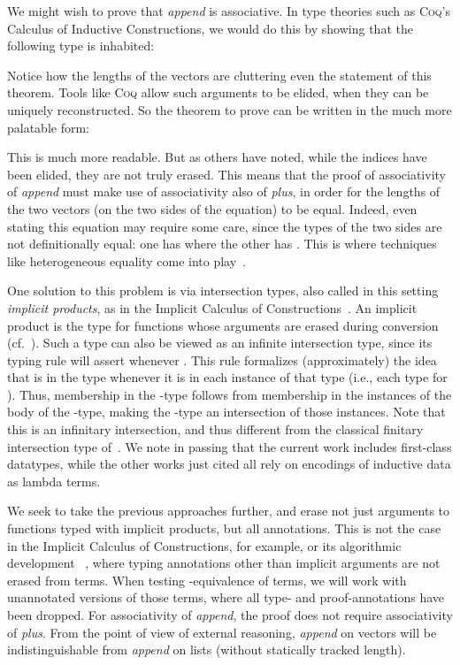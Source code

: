 \documentclass[copyright]{eptcs}
\begin{document}
\noindent We might wish to prove that \textit{append} is associative.
In type theories such as \textsc{Coq}'s Calculus of Inductive
Constructions, we would do this by showing that the following type is
inhabited:

\noindent Notice how the lengths of the vectors are cluttering even
the statement of this theorem.  Tools like \textsc{Coq} allow such
arguments to be elided, when they can be uniquely reconstructed.  So
the theorem to prove can be written in the much more palatable form:

\noindent This is much more readable.  But as others have noted, while
the indices have been elided, they are not truly erased.  This means
that the proof of associativity of \textit{append} must make use of
associativity also of \textit{plus}, in order for the lengths of the
two vectors (on the two sides of the equation) to be equal.  Indeed,
even stating this equation may require some care, since the types of
the two sides are not definitionally equal: one has
 where the other has
.  This is where
techniques like heterogeneous equality come into
play~\cite{mcbride99}.

One solution to this problem is via intersection types, also called in
this setting \emph{implicit products}, as in the Implicit Calculus of
Constructions~\cite{miquel01}.  An implicit product  is the type for functions whose arguments are erased
during conversion (cf.~\cite{mishra-linger+08,barras+08}).  Such a
type can also be viewed as an infinite intersection type, since its
typing rule will assert 
whenever .  This rule formalizes
(approximately) the idea that  is in the type  whenever it is in each instance of that type (i.e., each
type  for ).  Thus, membership in the
-type follows from membership in the instances of the body of
the -type, making the -type an intersection of those
instances.  Note that this is an infinitary intersection, and thus
different from the classical finitary intersection type
of~\cite{CoppoDezani78}.  We note in passing that the current work includes
first-class datatypes, while the other works just cited all rely on
encodings of inductive data as lambda terms.

We seek to take the previous approaches further, and erase not just
arguments to functions typed with implicit products, but all
annotations.  This is not the case in the Implicit Calculus of
Constructions, for example, or its algorithmic development
~\cite{barras+08}, where typing annotations other than
implicit arguments are not erased from terms.  When testing
-equivalence of terms, we will work with unannotated versions
of those terms, where all type- and proof-annotations have been
dropped.  For associativity of \textit{append}, the proof does not
require associativity of \textit{plus}.  From the point of view of
external reasoning, \textit{append} on vectors will be
indistinguishable from \textit{append} on lists (without statically
tracked length).  
\end{document}
